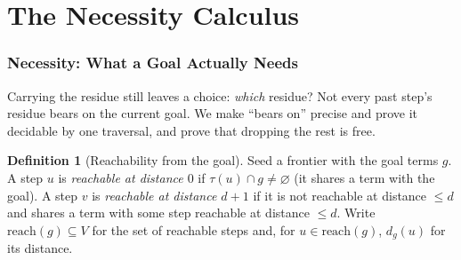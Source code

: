 \documentclass[11pt,twocolumn,a4paper]{article}
\theoremstyle{thmstyle}
\theoremstyle{definition}
\newtheorem{definition}[theorem]{Definition}
\theoremstyle{remark}
\newcommand{\Vrt}{V}
\newcommand{\goal}{g}                   %
\newcommand{\reach}{\mathrm{reach}}
\begin{document}
\part{The Necessity Calculus}

\section{Necessity: What a Goal Actually Needs}
\label{sec:necessity}

Carrying the residue still leaves a choice: \emph{which} residue? Not every past
step's residue bears on the current goal. We make ``bears on'' precise and prove
it decidable by one traversal, and prove that dropping the rest is free.

\begin{definition}[Reachability from the goal]
\label{def:reach}
Seed a frontier with the goal terms $\goal$. A step $u$ is \emph{reachable at
distance $0$} if $\tau(u)\cap\goal\neq\varnothing$ (it shares a term with the
goal). A step $v$ is \emph{reachable at distance $d+1$} if it is not reachable at
distance $\le d$ and shares a term with some step reachable at distance $\le d$.
Write $\reach(\goal)\subseteq\Vrt$ for the set of reachable steps and, for
$u\in\reach(\goal)$, $d_\goal(u)$ for its distance.
\end{definition}
\end{document}

